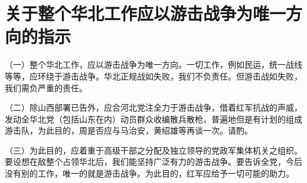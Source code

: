 \section[关于整个华北工作应以游击战争为唯一方向的指示（一九三七年九月二十五日）]{关于整个华北工作应以游击战争为唯一方向的指示}


（一）整个华北工作，应以游击战争为唯一方向。一切工作，例如民运，统一战线等等，应环绕于游击战争。华北正规战如失败，我们不负责任。但游击战如失败，我们需负严重的责任。

（二）除山西部署已告外，应合河北党注全力于游击战争，借着红军抗战的声威，发动全华北党（包括山东在内）动员群众收编散兵散枪，普遍地但是有计划的组成游击队，为此目的，周是否应与马治安，黄绍雄等再谈一次。请酌。

（三）为此目的，应着重于高级干部之分配及独立领导的党政军集体机关之组织。要设想在敌整个占领华北后，我们能坚持广泛有力的游击战争。要告诉全党，今后没有别的工作，唯一的就是游击战争。为此目的，红军应给予一切可能的助力。

